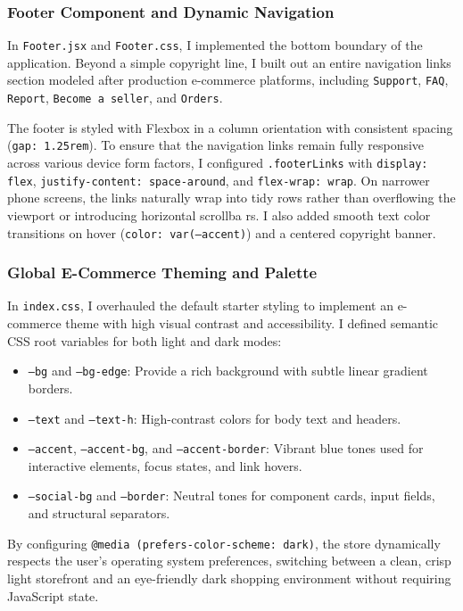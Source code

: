 \documentclass{article}[12pt]
\begin{document}
\subsubsection{Footer Component and Dynamic Navigation}
In \texttt{Footer.jsx} and \texttt{Footer.css}, I implemented the bottom boundary of the application. Beyond a simple copyright line, 
I built out an entire navigation links section modeled after production e-commerce platforms, including \texttt{Support}, \texttt{FAQ}, \texttt{Report}, \texttt{Become a seller}, and \texttt{Orders}.

The footer is styled with Flexbox in a column orientation with consistent spacing (\texttt{gap: 1.25rem}). To ensure that the navigation links 
remain fully responsive across various device form factors, I configured \texttt{.footerLinks} with \texttt{display: flex}, \texttt{justify-content: space-around},
and \texttt{flex-wrap: wrap}. On narrower phone screens, the links naturally wrap into tidy rows rather than overflowing the viewport or introducing horizontal scrollba rs.
I also added smooth text color transitions on hover (\texttt{color: var(--accent)}) and a centered copyright banner.

\subsubsection{Global E-Commerce Theming and Palette}
In \texttt{index.css}, I overhauled the default starter styling to implement an e-commerce theme with high visual contrast and accessibility. 
I defined semantic CSS root variables for both light and dark modes:
\begin{itemize}
    \item \texttt{--bg} and \texttt{--bg-edge}: Provide a rich background with subtle linear gradient borders.
    \item \texttt{--text} and \texttt{--text-h}: High-contrast colors for body text and headers.
    \item \texttt{--accent}, \texttt{--accent-bg}, and \texttt{--accent-border}: Vibrant blue tones used for interactive elements, focus states, and link hovers.
    \item \texttt{--social-bg} and \texttt{--border}: Neutral tones for component cards, input fields, and structural separators.
\end{itemize}

By configuring \texttt{@media (prefers-color-scheme: dark)}, the store dynamically respects the user's operating system preferences, 
switching between a clean, crisp light storefront and an eye-friendly dark shopping environment without requiring JavaScript state.
\end{document}
